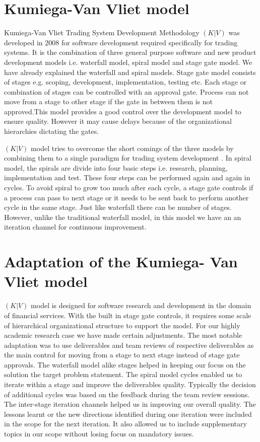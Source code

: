 \section{Kumiega-Van Vliet model}\label{kvvm}   
      
Kumiega-Van Vliet Trading System Development Methodology \((K|V)\) was developed in 2008 for software development required specifically for trading systems. It is the combination of three general purpose software and new product development models i.e. waterfall model, spiral model and stage gate model. We have already explained the waterfall and spiral models. Stage gate model consists of stages e.g. scoping, development, implementation, testing etc. Each stage or combination of stages can be controlled with an approval gate. Process can not move from a stage to other stage if the gate in between them is not approved.This model provides a good control over the development model to ensure quality. However it may cause delays because of the organizational hierarchies dictating the gates.

 \((K|V)\) model tries to overcome the short comings of the three models by combining them to a single paradigm for trading system development \cite{kumiega2008software}. In spiral model, the spirals are divide into four basic steps i.e. research, planning, implementation and test. These four steps can be performed again and again in cycles. To avoid spiral to grow too much after each cycle, a stage gate controls if a process can pass to next stage or it needs to be sent back to perform another cycle in the same stage. Just like waterfall there can be number of stages. However, unlike the traditional waterfall model, in this model we have an an iteration channel for continuous improvement.

 \section{Adaptation of the Kumiega- Van Vliet model}\label{adaptation}
 \((K|V)\) model is designed for software research  and development in the domain of financial services. With the built in stage gate controls, it requires some scale of hierarchical organizational structure to support the model. For our highly academic research case we have made certain adjustments. The most notable adaptation was to use deliverables and team reviews of respective deliverables as the main control for moving from a stage to next stage instead of stage gate approvals. The waterfall model alike stages helped in keeping our focus on the solution the target problem statement. The spiral model cycles enabled us to iterate within a stage and improve the deliverables quality. Typically the decision of additional cycles was based on the feedback during the team review sessions. The inter-stage iteration channels helped us in improving our overall quality. The lessons learnt or the new directions identified during one iteration were included in the scope for the next iteration. It also allowed us to include supplementary topics in our scope without losing focus on mandatory issues.
 
